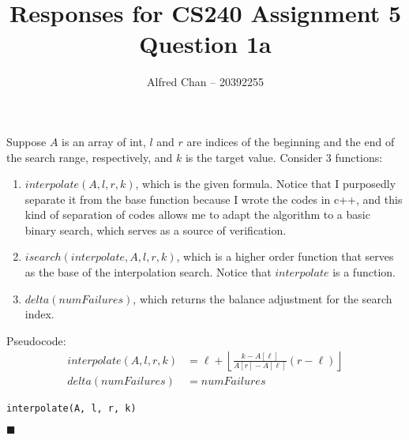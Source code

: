 \documentclass[12pt]{article}
\title{Responses for CS240 Assignment 5 Question 1a}
\author{Alfred Chan -- 20392255}
\begin{document}
\maketitle

Suppose $A$ is an array of int, $l$ and $r$ are indices of the beginning and the end of the search range, respectively, and $k$ is the target value. Consider 3 functions:
\begin{enumerate}
\item
$interpolate(A, l, r, k)$, which is the given formula. Notice that I purposedly separate it from the base function because I wrote the codes in c++, and this kind of separation of codes allows me to adapt the algorithm to a basic binary search, which serves as a source of verification.
\item
$isearch(interpolate, A, l, r, k)$, which is a higher order function that serves as the base of the interpolation search.
Notice that $interpolate$ is a function.
\item
$delta(numFailures)$, which returns the balance adjustment for the search index.
\end{enumerate}

Pseudocode:
\begin{align}
interpolate(A, l, r, k) &= \ell+\left\lfloor\frac{k-A[\ell]}{A[r]-A[\ell]}(r-\ell)\right\rfloor\\
delta(numFailures) &= numFailures
\end{align}

\begin{lstlisting}
interpolate(A, l, r, k)
\end{lstlisting}

\hfill $\blacksquare$
\end{document}
